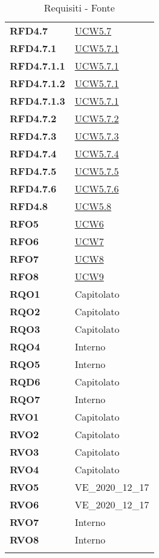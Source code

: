 \begin{longtable}[H]{|>{\centering\bfseries}m{8cm} | >{\centering\arraybackslash}m{8cm} |}
    RFD4.7 & \hyperref[ssub:ucw5.7]{UCW5.7} \\
    RFD4.7.1 & \hyperref[par:ucw5.7.1]{UCW5.7.1} \\
    RFD4.7.1.1 & \hyperref[par:ucw5.7.1]{UCW5.7.1} \\
    RFD4.7.1.2 & \hyperref[par:ucw5.7.1]{UCW5.7.1} \\
    RFD4.7.1.3 & \hyperref[par:ucw5.7.1]{UCW5.7.1} \\
    RFD4.7.2 & \hyperref[par:ucw5.7.2]{UCW5.7.2} \\
    RFD4.7.3 & \hyperref[par:ucw5.7.3]{UCW5.7.3} \\
    RFD4.7.4 & \hyperref[par:ucw5.7.4]{UCW5.7.4} \\
    RFD4.7.5 & \hyperref[spar:ucw5.7.5]{UCW5.7.5} \\
    RFD4.7.6 & \hyperref[spar:ucw5.7.6]{UCW5.7.6} \\
    RFD4.8 & \hyperref[ssub:ucw5.8]{UCW5.8} \\
    RFO5 & \hyperref[sub:ucw6]{UCW6} \\
    RFO6 & \hyperref[sub:ucw7]{UCW7} \\
    RFO7 & \hyperref[sub:ucw8]{UCW8} \\
    RFO8 & \hyperref[sub:ucw9]{UCW9} \\
    RQO1 & Capitolato \\
    RQO2 & Capitolato \\
    RQO3 & Capitolato \\
    RQO4 & Interno \\
    RQO5 & Interno \\
    RQD6 & Capitolato \\
    RQO7 & Interno \\
    RVO1 & Capitolato \\
    RVO2 & Capitolato \\
    RVO3 & Capitolato \\
    RVO4 & Capitolato \\
    RVO5 & \textsc{VE\_2020\_12\_17} \\
    RVO6 & \textsc{VE\_2020\_12\_17} \\
    RVO7 & Interno \\
    RVO8 & Interno \\
    
    \hline
    \rowcolor{white}
    \caption{Requisiti - Fonte}%
    \label{tab:requisiti_fonte}
\end{longtable}
